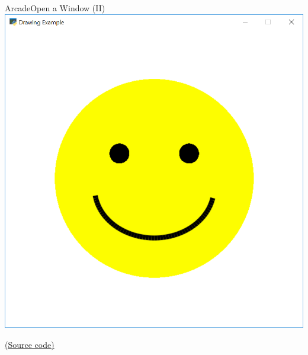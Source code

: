 \documentclass[10pt,compress]{beamer} %
\begin{document}
\begin{frame}{Arcade}{Open a Window (II)}
	\centering \includegraphics[width=0.5\linewidth]{figs/smile.png}
    \bigskip

    \href{https://api.arcade.academy/en/latest/examples/happy_face.html}{(Source code)}
\end{frame}
\end{document}
